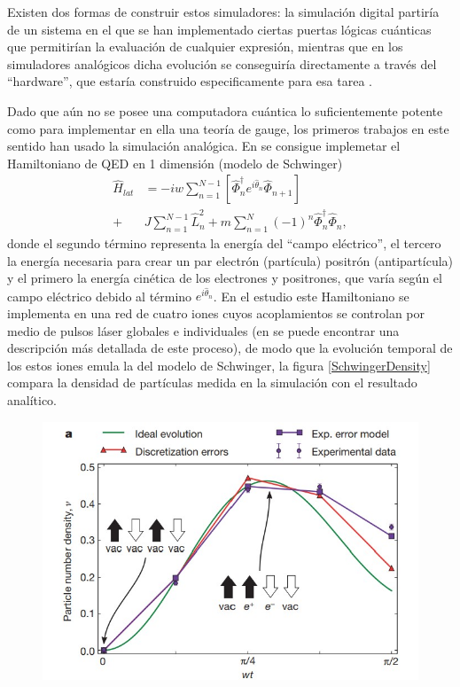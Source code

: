 \documentclass[a4paper,10pt]{article}
\begin{document}
\begin{multicols}{2}
Existen dos formas de construir estos simuladores: la simulación digital partiría de un sistema en el que se han implementado ciertas puertas lógicas cuánticas que permitirían la evaluación de cualquier expresión, mientras que en los simuladores analógicos dicha evolución se conseguiría directamente a través del ``hardware'', que estaría construido especificamente para esa tarea \cite{cirac_goals_2012}.

Dado que aún no se posee una computadora cuántica lo suficientemente potente como para implementar en ella una teoría de gauge, los primeros trabajos en este sentido han usado la simulación analógica. En \cite{martinez_real-time_2016} se consigue implemetar el Hamiltoniano de QED en 1 dimensión (modelo de Schwinger) 
\begin{align*}
\hat{H}_{lat} &  = -iw\sum_{n=1}^{N-1}\left[\hat{\Phi}^{\dagger}_{n}e^{i\hat{\theta}_{n}}\hat{\Phi}_{n+1} \right] \\
 + & J\sum_{n=1}^{N-1}\hat{L}_{n}^2 + m \sum_{n=1}^{N}(-1)^{n}\hat{\Phi}^{\dagger}_{n}\hat{\Phi}_{n},
\end{align*}
donde el segundo término representa la energía del ``campo eléctrico'', el tercero la energía necesaria para crear un par electrón (partícula) positrón (antipartícula) y el primero la energía cinética de los electrones y positrones, que varía según el campo eléctrico debido al término $e^{i\hat{\theta}_{n}}$. En el estudio este Hamiltoniano se implementa en una red de cuatro iones cuyos acoplamientos se controlan por medio de pulsos láser globales e individuales (en \cite{davoudi_towards_2020} se puede encontrar una descripción más detallada de este proceso), de modo que la evolución temporal de los estos iones emula la del modelo de Schwinger, la figura \ref{SchwingerDensity} compara la densidad de partículas medida en la simulación con el resultado analítico. 
\begin{figure}[H]
\begin{center}
\includegraphics[scale=0.8]{Imágenes/Creación pares partícula-antipartícula.jpg}

\end{center}
\end{figure}
\end{multicols}
\end{document}
